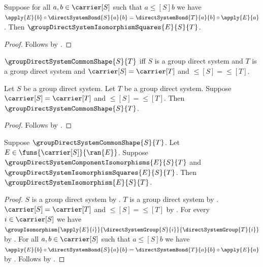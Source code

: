 \begin{proposition}\label{group_direct_system_isomorphism_squares_intro}
    Suppose for all $a,b\in\carrier[S]$ such that
        $a\mathrel{\leq[S]}b$ we have
        $\apply{E}{b}\circ\directSystemBond{S}{a}{b}=
            \directSystemBond{T}{a}{b}\circ\apply{E}{a}$.
    Then $\groupDirectSystemIsomorphismSquares{E}{S}{T}$.
\end{proposition}
\begin{proof}
    Follows by .
\end{proof}

\begin{definition}\label{group_direct_system_common_shape}
    $\groupDirectSystemCommonShape{S}{T}$ iff
        $S$ is a group direct system and
        $T$ is a group direct system and
        $\carrier[S]=\carrier[T]$ and
        $\leq[S]=\leq[T]$.
\end{definition}

\begin{proposition}\label{group_direct_system_common_shape_intro}
    Let $S$ be a group direct system.
    Let $T$ be a group direct system.
    Suppose $\carrier[S]=\carrier[T]$ and
        $\leq[S]=\leq[T]$.
    Then $\groupDirectSystemCommonShape{S}{T}$.
\end{proposition}
\begin{proof}
    Follows by .
\end{proof}

\begin{proposition}\label{group_direct_system_isomorphism_from_parts}
    Suppose $\groupDirectSystemCommonShape{S}{T}$.
    Let $E\in\funs{\carrier[S]}{\ran{E}}$.
    Suppose $\groupDirectSystemComponentIsomorphisms{E}{S}{T}$ and
        $\groupDirectSystemIsomorphismSquares{E}{S}{T}$.
    Then $\groupDirectSystemIsomorphism{E}{S}{T}$.
\end{proposition}
\begin{proof}
    $S$ is a group direct system by
        .
    $T$ is a group direct system by
        .
    $\carrier[S]=\carrier[T]$ and $\leq[S]=\leq[T]$ by
        .
    For every $i\in\carrier[S]$ we have
        $\groupIsomorphism{\apply{E}{i}}
            {\directSystemGroup{S}{i}}
            {\directSystemGroup{T}{i}}$ by
        .
    For all $a,b\in\carrier[S]$ such that
        $a\mathrel{\leq[S]}b$ we have
        $\apply{E}{b}\circ\directSystemBond{S}{a}{b}=
            \directSystemBond{T}{a}{b}\circ\apply{E}{a}$ by
        .
    Follows by .
\end{proof}

